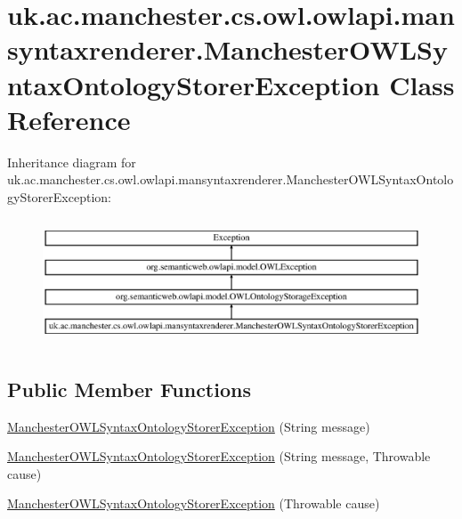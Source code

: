 \hypertarget{classuk_1_1ac_1_1manchester_1_1cs_1_1owl_1_1owlapi_1_1mansyntaxrenderer_1_1_manchester_o_w_l_syntax_ontology_storer_exception}{\section{uk.\-ac.\-manchester.\-cs.\-owl.\-owlapi.\-mansyntaxrenderer.\-Manchester\-O\-W\-L\-Syntax\-Ontology\-Storer\-Exception Class Reference}
\label{classuk_1_1ac_1_1manchester_1_1cs_1_1owl_1_1owlapi_1_1mansyntaxrenderer_1_1_manchester_o_w_l_syntax_ontology_storer_exception}
}
Inheritance diagram for uk.\-ac.\-manchester.\-cs.\-owl.\-owlapi.\-mansyntaxrenderer.\-Manchester\-O\-W\-L\-Syntax\-Ontology\-Storer\-Exception\-:\begin{figure}[H]
\begin{center}
\leavevmode
\includegraphics[height=3.790186cm]{classuk_1_1ac_1_1manchester_1_1cs_1_1owl_1_1owlapi_1_1mansyntaxrenderer_1_1_manchester_o_w_l_syntax_ontology_storer_exception}
\end{center}
\end{figure}
\subsection*{Public Member Functions}
\begin{DoxyCompactItemize}
\item 
\hyperlink{classuk_1_1ac_1_1manchester_1_1cs_1_1owl_1_1owlapi_1_1mansyntaxrenderer_1_1_manchester_o_w_l_syntax_ontology_storer_exception_adc94ed1b721619d1ece2be861e3da47c}{Manchester\-O\-W\-L\-Syntax\-Ontology\-Storer\-Exception} (String message)
\item 
\hyperlink{classuk_1_1ac_1_1manchester_1_1cs_1_1owl_1_1owlapi_1_1mansyntaxrenderer_1_1_manchester_o_w_l_syntax_ontology_storer_exception_a1ac79a81cc6f6ed9abadf9789dee9697}{Manchester\-O\-W\-L\-Syntax\-Ontology\-Storer\-Exception} (String message, Throwable cause)
\item 
\hyperlink{classuk_1_1ac_1_1manchester_1_1cs_1_1owl_1_1owlapi_1_1mansyntaxrenderer_1_1_manchester_o_w_l_syntax_ontology_storer_exception_a0dbf8c7b4b486717a83c451b7899fa5d}{Manchester\-O\-W\-L\-Syntax\-Ontology\-Storer\-Exception} (Throwable cause)
\end{DoxyCompactItemize}
